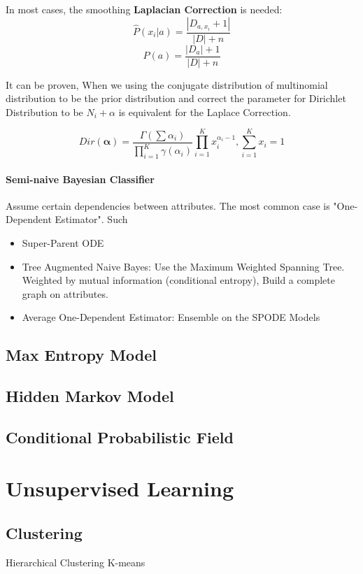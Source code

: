 \documentclass[11pt, openany]{book}              %
\begin{document}
In most cases, the smoothing \textbf{Laplacian Correction} is needed:
$$\hat{P}(x_i|a) = \frac{|D_{a,x_i}+1|}{|D|+n}$$
$$\hat{P}(a) = \frac{|D_{a}|+1}{|D|+n}$$

It can be proven, When we using the conjugate distribution of multinomial distribution to be the prior distribution and correct the parameter for Dirichlet Distribution to be $N_i+\alpha$ is equivalent for the Laplace Correction.

$$Dir(\mathbf{\alpha}) = \frac{\Gamma(\sum\alpha_i)}{\prod_{i=1}^K \gamma(\alpha_i)} \prod_{i=1}^K x_i^{\alpha_i-1}, \sum_{i=1}^K x_i =1$$

\subsection{Semi-naive Bayesian Classifier}

Assume certain dependencies between attributes. The most common case is "One-Dependent Estimator". Such 

\begin{itemize}
	\item Super-Parent ODE
	\item Tree Augmented Naive Bayes: Use the Maximum Weighted Spanning Tree. Weighted by mutual information (conditional entropy), Build a complete graph on attributes. 
	\item Average One-Dependent Estimator: Ensemble on the SPODE Models 	
\end{itemize}

\chapter{Max Entropy Model}
\chapter{Hidden Markov Model}
\chapter{Conditional Probabilistic Field}

\part{Unsupervised Learning}

\chapter{Clustering}
				Hierarchical Clustering
				K-means
\end{document}
